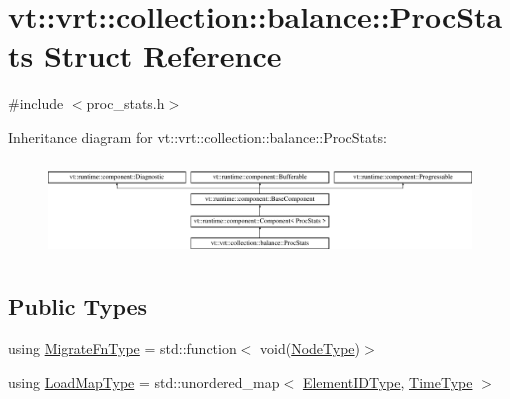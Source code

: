 \hypertarget{structvt_1_1vrt_1_1collection_1_1balance_1_1_proc_stats}{}\section{vt\+:\+:vrt\+:\+:collection\+:\+:balance\+:\+:Proc\+Stats Struct Reference}
\label{structvt_1_1vrt_1_1collection_1_1balance_1_1_proc_stats}


{\ttfamily \#include $<$proc\+\_\+stats.\+h$>$}

Inheritance diagram for vt\+:\+:vrt\+:\+:collection\+:\+:balance\+:\+:Proc\+Stats\+:\begin{figure}[H]
\begin{center}
\leavevmode
\includegraphics[height=2.565865cm]{structvt_1_1vrt_1_1collection_1_1balance_1_1_proc_stats}
\end{center}
\end{figure}
\subsection*{Public Types}
\begin{DoxyCompactItemize}
\item 
using \hyperlink{structvt_1_1vrt_1_1collection_1_1balance_1_1_proc_stats_a7cb065ac4de218cb717bc2634782f0cb}{Migrate\+Fn\+Type} = std\+::function$<$ void(\hyperlink{namespacevt_a866da9d0efc19c0a1ce79e9e492f47e2}{Node\+Type})$>$
\item 
using \hyperlink{structvt_1_1vrt_1_1collection_1_1balance_1_1_proc_stats_aa810fd21680061ec5d50f6526f66be31}{Load\+Map\+Type} = std\+::unordered\+\_\+map$<$ \hyperlink{namespacevt_1_1vrt_1_1collection_1_1balance_a14c8d2c972f2913aa3f1636e5be0a120}{Element\+I\+D\+Type}, \hyperlink{namespacevt_a876a9d0cd5a952859c72de8a46881442}{Time\+Type} $>$
\end{DoxyCompactItemize}
